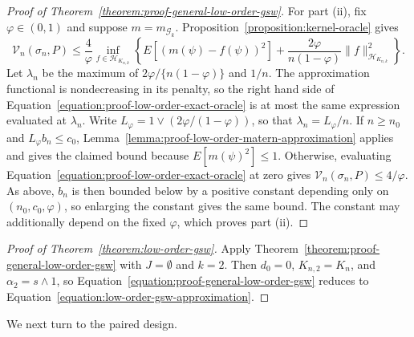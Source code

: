 \documentclass[letterpaper,12pt]{article}
\theoremstyle{definition}
\numberwithin{equation}{section}
\newcommand{\mc}{\mathcal}
\newcommand{\norm}[1]{\lVert#1\rVert}
\begin{document}
\begin{proof}[Proof of Theorem~\ref{theorem:proof-general-low-order-gsw}]
For part (ii), fix $\varphi\in(0,1)$ and suppose $m=m_{\mc G_k}$.
Proposition~\ref{proposition:kernel-oracle} gives
\begin{equation}\label{equation:proof-low-order-exact-oracle}
\mc V_n(\sigma_n,P)\leq\frac4\varphi\inf_{f\in\mc H_{K_{n,k}}}\left\{E[(m(\psi)-f(\psi))^2]+\frac{2\varphi}{n(1-\varphi)}\norm{f}_{\mc H_{K_{n,k}}}^2\right\}.
\end{equation}
Let $\lambda_n$ be the maximum of $2\varphi/\{n(1-\varphi)\}$ and $1/n$.
The approximation functional is nondecreasing in its penalty, so the right hand side of Equation~\eqref{equation:proof-low-order-exact-oracle} is at most the same expression evaluated at $\lambda_n$.
Write $L_\varphi=1\vee(2\varphi/(1-\varphi))$, so that $\lambda_n=L_\varphi/n$.
If $n\geq n_0$ and $L_\varphi b_n\leq c_0$, Lemma~\ref{lemma:proof-low-order-matern-approximation} applies and gives the claimed bound because $E[m(\psi)^2]\leq1$.
Otherwise, evaluating Equation~\eqref{equation:proof-low-order-exact-oracle} at zero gives $\mc V_n(\sigma_n,P)\leq4/\varphi$.
As above, $b_n$ is then bounded below by a positive constant depending only on $(n_0,c_0,\varphi)$, so enlarging the constant gives the same bound.
The constant may additionally depend on the fixed $\varphi$, which proves part (ii).
\end{proof}

\begin{proof}[Proof of Theorem~\ref{theorem:low-order-gsw}]
Apply Theorem~\ref{theorem:proof-general-low-order-gsw} with $J=\emptyset$ and $k=2$.
Then $d_0=0$, $K_{n,2}=K_n$, and $\alpha_2=s\wedge1$, so Equation~\eqref{equation:proof-general-low-order-gsw} reduces to Equation~\eqref{equation:low-order-gsw-approximation}.
\end{proof}

We next turn to the paired design.
\end{document}
